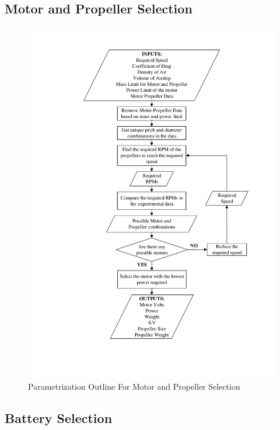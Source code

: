 \documentclass[../main.tex]{subfiles}
\begin{document}
\subsection{Motor and Propeller Selection} \label{motorSelect}

\begin{figure}[H]
	\centering
	\includegraphics[width=0.7\linewidth]{img/paramaterization/motorPropellerChoice.pdf}
	\caption{Parametrization Outline For Motor and Propeller Selection}
	\label{fig:motorOutline}
\end{figure}

\subsection{Battery Selection} \label{batterySelect}
\end{document}
